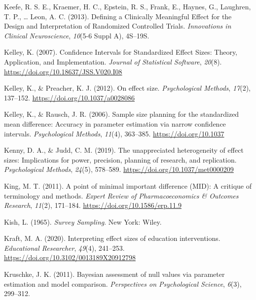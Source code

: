 \documentclass[
  english,
  ,jou, a4paper,floatsintext]{apa6}
\newlength{\cslhangindent}
\newenvironment{cslreferences}%
  {\setlength{\parindent}{0pt}%
  \everypar{\setlength{\hangindent}{\cslhangindent}}\ignorespaces}%
  {\par}
\begin{document}
\begin{cslreferences}
\leavevmode\hypertarget{ref-keefe_defining_2013}{}%
Keefe, R. S. E., Kraemer, H. C., Epstein, R. S., Frank, E., Haynes, G., Laughren, T. P., \ldots{} Leon, A. C. (2013). Defining a Clinically Meaningful Effect for the Design and Interpretation of Randomized Controlled Trials. \emph{Innovations in Clinical Neuroscience}, \emph{10}(5-6 Suppl A), 4S--19S.

\leavevmode\hypertarget{ref-kelley_confidence_2007}{}%
Kelley, K. (2007). Confidence Intervals for Standardized Effect Sizes: Theory, Application, and Implementation. \emph{Journal of Statistical Software}, \emph{20}(8). \url{https://doi.org/10.18637/JSS.V020.I08}

\leavevmode\hypertarget{ref-kelley_effect_2012}{}%
Kelley, K., \& Preacher, K. J. (2012). On effect size. \emph{Psychological Methods}, \emph{17}(2), 137--152. \url{https://doi.org/10.1037/a0028086}

\leavevmode\hypertarget{ref-kelley_sample_2006}{}%
Kelley, K., \& Rausch, J. R. (2006). Sample size planning for the standardized mean difference: Accuracy in parameter estimation via narrow confidence intervals. \emph{Psychological Methods}, \emph{11}(4), 363--385. \url{https://doi.org/10.1037}

\leavevmode\hypertarget{ref-kenny_unappreciated_2019}{}%
Kenny, D. A., \& Judd, C. M. (2019). The unappreciated heterogeneity of effect sizes: Implications for power, precision, planning of research, and replication. \emph{Psychological Methods}, \emph{24}(5), 578--589. \url{https://doi.org/10.1037/met0000209}

\leavevmode\hypertarget{ref-king_point_2011}{}%
King, M. T. (2011). A point of minimal important difference (MID): A critique of terminology and methods. \emph{Expert Review of Pharmacoeconomics \& Outcomes Research}, \emph{11}(2), 171--184. \url{https://doi.org/10.1586/erp.11.9}

\leavevmode\hypertarget{ref-kish_survey_1965}{}%
Kish, L. (1965). \emph{Survey Sampling}. New York: Wiley.

\leavevmode\hypertarget{ref-kraft_interpreting_2020}{}%
Kraft, M. A. (2020). Interpreting effect sizes of education interventions. \emph{Educational Researcher}, \emph{49}(4), 241--253. \url{https://doi.org/10.3102/0013189X20912798}

\leavevmode\hypertarget{ref-kruschke_bayesian_2011}{}%
Kruschke, J. K. (2011). Bayesian assessment of null values via parameter estimation and model comparison. \emph{Perspectives on Psychological Science}, \emph{6}(3), 299--312.


\end{cslreferences}
\end{document}
